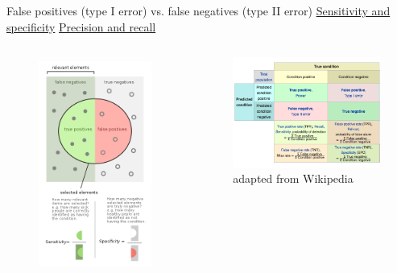 \documentclass{beamer}\usepackage[]{graphicx}\usepackage[]{color}
\begin{document}
\begin{frame}
False positives (type I error) vs.  false negatives (type II error) \newline
\scriptsize
\href{https://en.wikipedia.org/wiki/Sensitivity_and_specificity}{Sensitivity and specificity} \newline
\href{https://en.wikipedia.org/wiki/Precision_and_recall}{Precision and recall}

\begin{columns}
\begin{center}
\begin{figure}
\includegraphics[height=7cm]{Images/sensitivity-specificity}
\end{figure}
\end{center}
\begin{center}
\begin{figure}
\includegraphics[width=5cm]{Images/confusion-matrix}
\caption{adapted from Wikipedia}
\end{figure}
\end{center}
\end{columns}
\end{frame}
\end{document}

